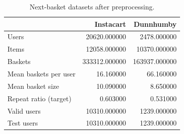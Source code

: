 \begin{table}[H]
\caption{Next-basket datasets after preprocessing.}
\label{tab:basket_stats}
\begin{tabular}{lrr}
\toprule
 & Instacart & Dunnhumby \\
\midrule
Users & 20620.000000 & 2478.000000 \\
Items & 12058.000000 & 10370.000000 \\
Baskets & 333312.000000 & 163937.000000 \\
Mean baskets per user & 16.160000 & 66.160000 \\
Mean basket size & 10.090000 & 8.650000 \\
Repeat ratio (target) & 0.603000 & 0.531000 \\
Valid users & 10310.000000 & 1239.000000 \\
Test users & 10310.000000 & 1239.000000 \\
\bottomrule
\end{tabular}
\end{table}
